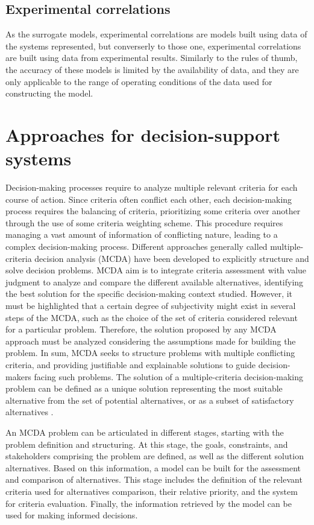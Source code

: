 \begin{refsection}[referencesCh1]
\subsection{Experimental correlations}
As the surrogate models, experimental correlations are models built using data of the systems represented, but converserly to those one, experimental correlations are built using data  from experimental results. Similarly to the rules of thumb, the accuracy of these models is limited by the availability of data, and they are only applicable to the range of operating conditions of the data used for constructing the model.

\section{Approaches for decision-support systems}
Decision-making processes require to analyze multiple relevant criteria for each course of action. Since criteria often conflict each other, each decision-making process requires the balancing of criteria, prioritizing some criteria over another through the use of some criteria weighting scheme. This procedure requires managing a vast amount of information of conflicting nature, leading to a complex decision-making process. Different approaches generally called multiple-criteria decision analysis (MCDA) have been developed to explicitly structure and solve decision problems. MCDA aim is to integrate criteria assessment with value judgment to analyze and compare the different available alternatives, identifying the best solution for the specific decision-making context studied. However, it must be highlighted that a certain degree of subjectivity might exist in several steps of the MCDA, such as the choice of the set of criteria considered relevant for a particular problem. Therefore, the solution proposed by any MCDA approach must be analyzed considering the assumptions made for building the problem. In sum, MCDA seeks to structure problems with multiple conflicting criteria, and providing justifiable and explainable solutions to guide decision-makers facing such problems. The solution of a multiple-criteria decision-making problem can be defined as a unique solution representing the most suitable alternative from the set of potential alternatives,
or as a subset of satisfactory alternatives \citep{belton2002multiple}.

An MCDA problem can be articulated in different stages, starting with the problem definition and structuring. At this stage, the goals, constraints, and stakeholders comprising the problem are defined, as well as the different solution alternatives. Based on this information, a model can be built for the assessment and comparison of alternatives. This stage includes the definition of the relevant criteria used for alternatives comparison, their relative priority, and the system for criteria evaluation. Finally, the information retrieved by the model can be used for making informed decisions.


\end{refsection}
